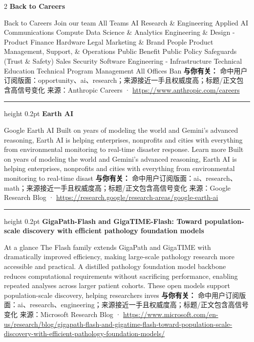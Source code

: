 \documentclass[10.5pt]{ctexart}
\begin{document}
\begin{multicols}{2}
{\large\bfseries Back to Careers}\par
Back to Careers Join our team All Teams AI Research \& Engineering Applied AI Communications Compute Data Science \& Analytics Engineering \& Design - Product Finance Hardware Legal Marketing \& Brand People Product Management, Support, \& Operations Public Benefit Public Policy Safeguards (Trust \& Safety) Sales Security Software Engineering - Infrastructure Technical Education Technical Program Management All Offices Ban
\textbf{与你有关：} 命中用户订阅版面：opportunity、ai、research；来源接近一手且权威度高；标题/正文包含高信号变化
{\footnotesize\color{ormuted} 来源：Anthropic Careers · \url{https://www.anthropic.com/careers}}
\vspace{2mm}
\hrule height 0.2pt
\vspace{2mm}
{\large\bfseries Earth AI}\par
Google Earth AI Built on years of modeling the world and Gemini’s advanced reasoning, Earth AI is helping enterprises, nonprofits and cities with everything from environmental monitoring to real-time disaster response. Learn more Built on years of modeling the world and Gemini’s advanced reasoning, Earth AI is helping enterprises, nonprofits and cities with everything from environmental monitoring to real-time disast
\textbf{与你有关：} 命中用户订阅版面：ai、research、math；来源接近一手且权威度高；标题/正文包含高信号变化
{\footnotesize\color{ormuted} 来源：Google Research Blog · \url{https://research.google/research-areas/google-earth-ai}}
\vspace{2mm}
\hrule height 0.2pt
\vspace{2mm}
{\large\bfseries GigaPath-Flash and GigaTIME-Flash: Toward population-scale discovery with efficient pathology foundation models}\par
At a glance The Flash family extends GigaPath and GigaTIME with dramatically improved efficiency, making large-scale pathology research more accessible and practical. A distilled pathology foundation model backbone reduces computational requirements without sacrificing performance, enabling repeated analyses across larger patient cohorts. These open models support population-scale discovery, helping researchers inves
\textbf{与你有关：} 命中用户订阅版面：ai、research、engineering；来源接近一手且权威度高；标题/正文包含高信号变化
{\footnotesize\color{ormuted} 来源：Microsoft Research Blog · \url{https://www.microsoft.com/en-us/research/blog/gigapath-flash-and-gigatime-flash-toward-population-scale-discovery-with-efficient-pathology-foundation-models/}}

\end{multicols}
\end{document}
